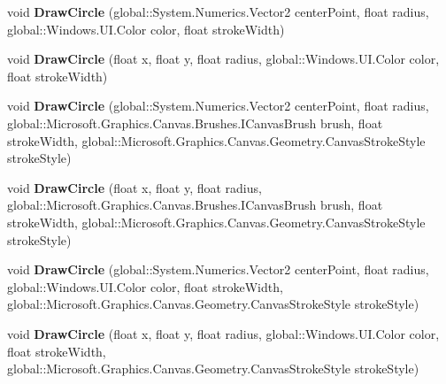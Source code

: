 \begin{DoxyCompactItemize}
void {\bfseries Draw\+Circle} (global\+::\+System.\+Numerics.\+Vector2 center\+Point, float radius, global\+::\+Windows.\+U\+I.\+Color color, float stroke\+Width)
\item 
\mbox{\label{interface_microsoft_1_1_graphics_1_1_canvas_1_1_i_canvas_drawing_session_a34d82da4cfcb24e255b6320b7a2d999b}} 
void {\bfseries Draw\+Circle} (float x, float y, float radius, global\+::\+Windows.\+U\+I.\+Color color, float stroke\+Width)
\item 
\mbox{\label{interface_microsoft_1_1_graphics_1_1_canvas_1_1_i_canvas_drawing_session_a0a8248f4a2fd8895425d254f73ca7350}} 
void {\bfseries Draw\+Circle} (global\+::\+System.\+Numerics.\+Vector2 center\+Point, float radius, global\+::\+Microsoft.\+Graphics.\+Canvas.\+Brushes.\+I\+Canvas\+Brush brush, float stroke\+Width, global\+::\+Microsoft.\+Graphics.\+Canvas.\+Geometry.\+Canvas\+Stroke\+Style stroke\+Style)
\item 
\mbox{\label{interface_microsoft_1_1_graphics_1_1_canvas_1_1_i_canvas_drawing_session_a817ea9d1d097ed18a62e9ef040bba1dc}} 
void {\bfseries Draw\+Circle} (float x, float y, float radius, global\+::\+Microsoft.\+Graphics.\+Canvas.\+Brushes.\+I\+Canvas\+Brush brush, float stroke\+Width, global\+::\+Microsoft.\+Graphics.\+Canvas.\+Geometry.\+Canvas\+Stroke\+Style stroke\+Style)
\item 
\mbox{\label{interface_microsoft_1_1_graphics_1_1_canvas_1_1_i_canvas_drawing_session_a77be01d141f925bb393cbb8229f35498}} 
void {\bfseries Draw\+Circle} (global\+::\+System.\+Numerics.\+Vector2 center\+Point, float radius, global\+::\+Windows.\+U\+I.\+Color color, float stroke\+Width, global\+::\+Microsoft.\+Graphics.\+Canvas.\+Geometry.\+Canvas\+Stroke\+Style stroke\+Style)
\item 
\mbox{\label{interface_microsoft_1_1_graphics_1_1_canvas_1_1_i_canvas_drawing_session_a2009ac7efb7be9924ed54c9810645953}} 
void {\bfseries Draw\+Circle} (float x, float y, float radius, global\+::\+Windows.\+U\+I.\+Color color, float stroke\+Width, global\+::\+Microsoft.\+Graphics.\+Canvas.\+Geometry.\+Canvas\+Stroke\+Style stroke\+Style)

\end{DoxyCompactItemize}
